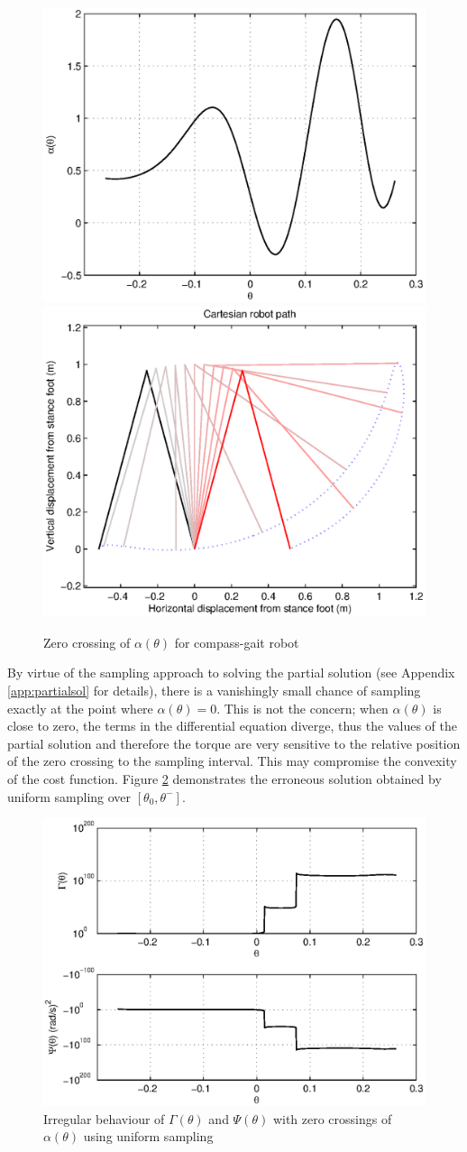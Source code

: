 \begin{figure}
	\centering
	\includegraphics[width=0.49\linewidth]{4VirtConstLib/al0Crossing.eps}
	\includegraphics[width=0.49\linewidth]{4VirtConstLib/xy-0Crossing.eps}
	\caption{Zero crossing of $\alpha(\theta)$ for compass-gait robot}
	\label{fig:alphazerocrossing}
\end{figure}

By virtue of the sampling approach to solving the partial solution (see Appendix \ref{app:partialsol} for details), there is a vanishingly small chance of sampling exactly at the point where $\alpha(\theta)=0$. This is not the concern; when $\alpha(\theta)$ is close to zero, the terms in the differential equation diverge, thus the values of the partial solution and therefore the torque are very sensitive to the relative position of the zero crossing to the sampling interval. This may compromise the convexity of the cost function. Figure \ref{fig:divergence0crossing} demonstrates the erroneous solution obtained by uniform sampling over $[\theta_0, \theta^-]$.
 
\begin{figure}
	\centering
	\includegraphics[width=0.6\linewidth]{4VirtConstLib/GamPsi0Crossing.eps}
	\caption[Irregular behaviour of $\Gamma(\theta)$ and $\Psi(\theta)$ with zero crossings of $\alpha(\theta)$]{Irregular behaviour of $\Gamma(\theta)$ and $\Psi(\theta)$ with zero crossings of $\alpha(\theta)$ using uniform sampling}
	\label{fig:divergence0crossing}
\end{figure}

